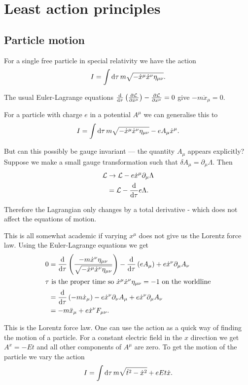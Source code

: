 \documentclass{notes}
\newcommand{\cL}{\mathcal{L}}
\begin{document}
\section{Least action principles}

\subsection{Particle motion}

For a single free particle in special relativity we have the action
\[
I = \int \mathrm{d} \tau\, m \sqrt{- \dot{x}^\mu \dot{x}^\nu \eta_{\mu \nu}}.
\]

The usual Euler-Lagrange equations
$\diff{}{\tau} \left( \pd{\cL}{\dot{x}^\mu} \right) - \pd{\cL}{x^\mu} = 0$ give
$- m \ddot{x}_\mu = 0$.

For a particle with charge $e$ in a potential $A^\mu$ we can generalise
this to
\[
I = \int \mathrm{d} \tau\, m \sqrt{- \dot{x}^\mu \dot{x}^\nu \eta_{\mu \nu}}
- e A_\mu \dot{x}^\mu.
\]

But can this possibly be gauge invariant --- the quantity $A_\mu$
appears explicitly?  Suppose we make a small gauge transformation
such that $\delta A_\mu = \partial_\mu \Lambda$.  Then
\begin{align*}
\cL &\to \cL - e \dot{x}^\mu \partial_\mu \Lambda \\
&= \cL - \diff{}{\tau} e \Lambda.
\end{align*}

Therefore the Lagrangian only changes by a total derivative - which
does not affect the equations of motion.

This is all somewhat academic if varying $x^\mu$ does not give us the Lorentz
force law.  Using the Euler-Lagrange equations we get
\begin{align*}
0 &= \frac{\mathrm{d}}{\mathrm{d}\tau} \left( \frac{- m \dot{x}^\nu \eta_{\mu \nu}}
{\sqrt{- \dot{x}^\mu \dot{x}^\nu \eta_{\mu \nu}}} \right)
- \frac{\mathrm{d}}{\mathrm{d}\tau} \left(e A_\mu \right) + e \dot{x}^\nu \partial_\mu A_\nu \\
\intertext{$\tau$ is the proper time so $\dot{x}^\mu \dot{x}^\nu \eta_{\mu \nu}
= -1$ on the worldline}
&= \frac{\mathrm{d}}{\mathrm{d}\tau} \left(- m \dot{x}_\mu\right)  - e \dot{x}^\nu
\partial_\nu A_\mu + e \dot{x}^\nu \partial_\mu A_\nu \\
&= -m \ddot{x}_\mu + e \dot{x}^\nu F_{\mu \nu}.
\end{align*}

This is the Lorentz force law.  One can use the action as a quick way of
finding the motion of a particle.  For a constant electric field in
the $x$ direction we get $A^x = - E t$ and all other components of
$A^\mu$ are zero.  To get the motion of the particle we vary the action
\[
I = \int \mathrm{d} \tau\, m \sqrt{\dot{t}^2 - \dot{x}^2} + e E t \dot{x}.
\]
\end{document}
